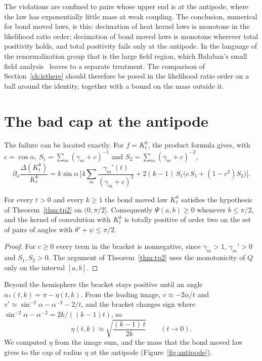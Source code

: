 The violations are confined to pairs whose upper end is at the antipode, where the law has exponentially little mass at weak coupling. The conclusion, numerical for bond moved laws, is this: decimation of heat kernel laws is monotone in the likelihood ratio order; decimation of bond moved laws is monotone wherever total positivity holds, and total positivity fails only at the antipode. In the language of the renormalization group that is the large field region, which Ba\l aban's small field analysis~\cite{Ba87} leaves to a separate treatment. The comparison of Section~\ref{ch:isthere} should therefore be posed in the likelihood ratio order on a ball around the identity, together with a bound on the mass outside it.

\section{The bad cap at the antipode}

The failure can be located exactly. For $f=K_t^k$, the product formula gives, with $c=\cos\alpha$, $S_1=\sum_m(\gamma_m+c)^{-1}$ and $S_2=\sum_m(\gamma_m+c)^{-2}$,
\[
\partial_\alpha\frac{\Delta(K_t^k)}{K_t^k}=k\sin\alpha\,\Big[4\sum_m\frac{\gamma_m'(t)}{(\gamma_m+c)^2}+2(k-1)\,S_1\big(c\,S_1+(1-c^2)S_2\big)\Big].
\]

\begin{theorem}\label{thm:hemisphere}
For every $t>0$ and every $k\ge1$ the bond moved law $K_t^k$ satisfies the hypothesis of Theorem~\ref{thm:tp2} on $(0,\pi/2]$. Consequently $\Psi(a,b)\ge0$ whenever $b\le\pi/2$, and the kernel of convolution with $K_t^k$ is totally positive of order two on the set of pairs of angles with $\theta'+\psi\le\pi/2$.
\end{theorem}

\begin{proof}
For $c\ge0$ every term in the bracket is nonnegative, since $\gamma_m>1$, $\gamma_m'>0$ and $S_1,S_2>0$. The argument of Theorem~\ref{thm:tp2} uses the monotonicity of $Q$ only on the interval $[a,b]$.
\end{proof}

Beyond the hemisphere the bracket stays positive until an angle $\alpha_*(t,k)=\pi-\eta(t,k)$. From the leading image, $v\approx-2\alpha/t$ and $v'\approx\sin^{-2}\alpha-\alpha^{-2}-2/t$, and the bracket changes sign where $\sin^{-2}\alpha-\alpha^{-2}=2k/((k-1)t)$, so
\[
\eta(t,k)\approx\sqrt{\frac{(k-1)\,t}{2k}}\qquad(t\to0).
\]
We computed $\eta$ from the image sum, and the mass that the bond moved law gives to the cap of radius $\eta$ at the antipode (Figure~\ref{fig:antipode}).

